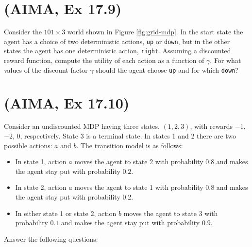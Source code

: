 \documentclass[11pt, a4paper]{article}
\begin{document}
\newpage

\section{(AIMA, Ex 17.9)} \label{sec:17.9}

Consider the $101 \times 3$ world shown in Figure \ref{fig:grid-mdp}. In the start state the agent has a choice of two deterministic actions, \texttt{up} or \texttt{down}, but in the other states the agent has one deterministic action, \texttt{right}. Assuming a discounted reward function, compute the utility of each action as a function of $\gamma$. For what values of the discount factor $\gamma$ should the agent choose \texttt{up} and for which \texttt{down}?


\newpage

\section{(AIMA, Ex 17.10)}

Consider an undiscounted MDP having three states, $(1, 2, 3)$, with rewards $-1$, $-2$, $0$, respectively. State 3 is a terminal state. In states 1 and 2 there are two possible actions: $a$ and $b$. The transition model is as follows:

\begin{itemize}
    \item In state 1, action $a$ moves the agent to state 2 with probability $0.8$ and makes the agent stay put with probability $0.2$.
    \item In state 2, action $a$ moves the agent to state 1 with probability $0.8$ and makes the agent stay put with probability 0.2.
    \item In either state 1 or state 2, action $b$ moves the agent to state 3 with probability $0.1$ and makes the agent stay put with probability $0.9$.
\end{itemize}

Answer the following questions:
\end{document}
